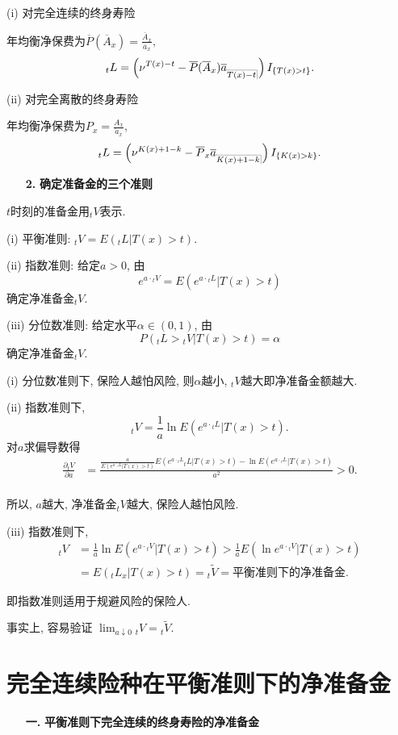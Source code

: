 \documentclass[a4paper,openany, 10pt]{ctexbook}
\makeatletter
\newcommand{\hei}{\CJKfamily{hei}}      %
\def\z{\left}
\def\y{\right}
\def\no{\nonumber}
\DeclareRobustCommand{\annu}[1]{_{%
    \def\arraystretch{0}%
    \setlength\arraycolsep{1pt}%
    \setlength\arrayrulewidth{.2pt}%
    \begin{array}[b]{@{}c|}\hline
        \\[\arraycolsep]%
        \scriptstyle #1%
    \end{array}%
}}
\makeatother
\begin{document}
(i) 对完全连续的终身寿险

年均衡净保费为$\overline{P}( \overline{A}_x )=\frac{\overline A_x}{\overline a_x},$
$${}_tL=\z(\nu^{T(x)-t}-\overline{P}( \overline{A}_x )\overline a_{\annu {T(x)-t}}\y)I_{\{T(x)>t\}}.$$

(ii) 对完全离散的终身寿险

年均衡净保费为$P_x=\frac{A_x}{\ddot{a}_x},$
$${}_tL=\z(\nu^{K(x)+1-k}-\overline{P}_x \overline a_{\annu {K(x)+1-k}}\y)I_{\{K(x)>k\}}.$$

\begin{itemize}
    \item[{\bf\hei  2.}]{\bf\hei 确定准备金的三个准则}
\end{itemize}

$t$时刻的准备金用${}_tV$表示.

(i) 平衡准则: ${}_tV=E({}_tL|T(x)>t).$

(ii) 指数准则: 给定$a>0$, 由$$e^{a\cdot{}_tV}=E(e^{a\cdot{}_tL}|T(x)>t)$$确定净准备金${}_tV.$

(iii) 分位数准则: 给定水平$\alpha\in(0,1)$, 由$$P({}_tL>{}_tV|T(x)>t)=\alpha$$确定净准备金${}_tV.$

\begin{remark}
  (i) 分位数准则下, 保险人越怕风险, 则$\alpha$越小, ${}_tV$越大即净准备金额越大.

(ii) 指数准则下, $${}_tV=\frac{1}{a}\ln E(e^{a\cdot{}_tL}|T(x)>t).$$
对$a$求偏导数得
\begin{align*}
    \frac{\partial {}_tV}{\partial a} &= \frac{\frac{a}{E(e^{a\cdot {}_tL}|T( x ) >t )}E( e^{a\cdot {}_tL}{}_tL|T( x ) >t )-\ln E( e^{a\cdot {}_tL}|T( x ) >t )}{a^2} >0. \\
\end{align*}

所以, $a$越大, 净准备金${}_tV$越大, 保险人越怕风险.

(iii) 指数准则下,
\begin{align*}
   {}_tV&=\frac{1}{a}\ln E(e^{a\cdot{}_tV}|T(x)>t)>\frac{1}{a}E(\ln e^{ a\cdot {}_tV}|T(x)>t)\no\\
   &=E(_tL_x|T(x)>t)={}_t\widetilde{V}=\text{平衡准则下的净准备金.}
\end{align*}

即指数准则适用于规避风险的保险人.

事实上, 容易验证 $\lim_{a\downarrow 0}{}_tV={}_t\widetilde{V}.$
\end{remark}

\section{完全连续险种在平衡准则下的净准备金}
\begin{itemize}
    \item[{\bf\hei 一.}]{\bf\hei 平衡准则下完全连续的终身寿险的净准备金}
\end{itemize}
\end{document}
